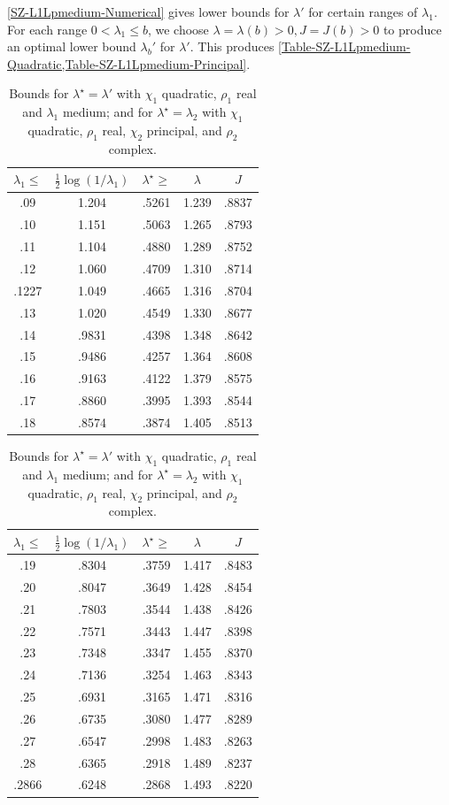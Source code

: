\documentclass[12pt,psamsfonts]{amsart}
\theoremstyle{definition}
\theoremstyle{remark}
\numberwithin{equation}{section}
\begin{document}
\cref{SZ-L1Lpmedium-Numerical} gives lower bounds for $\lambda'$ for certain ranges of $\lambda_1$. For each range $0 < \lambda_1 \leq b$, we choose $\lambda = \lambda(b) > 0, J = J(b) > 0$ to produce an optimal lower bound $\lambda_b'$ for $\lambda'$. This produces \cref{Table-SZ-L1Lpmedium-Quadratic,Table-SZ-L1Lpmedium-Principal}.
\begin{table}

\begin{tabular}{c|c|c|c|c} 
 $\lambda_1 \leq$ & $\tfrac{1}{2}\log(1/\lambda_1)$ & $\lambda^{\star} \geq $ & $\lambda$ & $J$ \\ 
 \hline 
 .09 &  1.204 &  .5261 &  1.239 &  .8837 \\ 
 .10 &  1.151 &  .5063 &  1.265 &  .8793 \\ 
 .11 &  1.104 &  .4880 &  1.289 &  .8752 \\ 
 .12 &  1.060 &  .4709 &  1.310 &  .8714 \\ 
 .1227 &  1.049 &  .4665 &  1.316 &  .8704 \\ 
 .13 &  1.020 &  .4549 &  1.330 &  .8677 \\ 
 .14 &  .9831 &  .4398 &  1.348 &  .8642 \\ 
 .15 &  .9486 &  .4257 &  1.364 &  .8608 \\ 
 .16 &  .9163 &  .4122 &  1.379 &  .8575 \\ 
 .17 &  .8860 &  .3995 &  1.393 &  .8544 \\ 
 .18 &  .8574 &  .3874 &  1.405 &  .8513 \\ 
 \end{tabular}
 \qquad
 \begin{tabular}{c|c|c|c|c} 
 $\lambda_1 \leq$ & $\tfrac{1}{2}\log(1/\lambda_1)$ & $\lambda^{\star} \geq $ & $\lambda$ & $J$ \\ 
 \hline 
  .19 &  .8304 &  .3759 &  1.417 &  .8483 \\ 
 .20 &  .8047 &  .3649 &  1.428 &  .8454 \\ 
 .21 &  .7803 &  .3544 &  1.438 &  .8426 \\ 
 .22 &  .7571 &  .3443 &  1.447 &  .8398 \\ 
 .23 &  .7348 &  .3347 &  1.455 &  .8370 \\ 
 .24 &  .7136 &  .3254 &  1.463 &  .8343 \\ 
 .25 &  .6931 &  .3165 &  1.471 &  .8316 \\ 
 .26 &  .6735 &  .3080 &  1.477 &  .8289 \\ 
 .27 &  .6547 &  .2998 &  1.483 &  .8263 \\ 
 .28 &  .6365 &  .2918 &  1.489 &  .8237 \\ 
 .2866 &  .6248 &  .2868 &  1.493 &  .8220 \\ 
\end{tabular}

\captionsetup{justification=centering}
\caption{Bounds for $\lambda^{\star} = \lambda'$ with $\chi_1$ quadratic, $\rho_1$ real and $\lambda_1$ medium; 
\newline and for $\lambda^{\star} = \lambda_2$ with $\chi_1$ quadratic, $\rho_1$ real, $\chi_2$ principal, and $\rho_2$ complex.}
\label{Table-SZ-L1L2medium-QuadPrincip}
\label{Table-SZ-L1Lpmedium-Quadratic}
\end{table}
\end{document}
